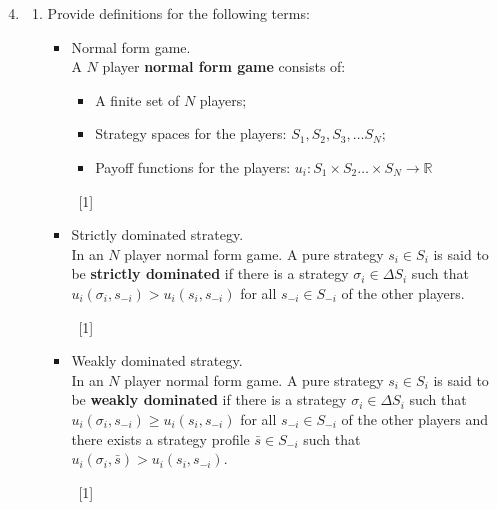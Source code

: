 \documentclass[12pt,a4paper]{article}
\renewcommand{\labelenumi}{\arabic{enumi}} %
\begin{document}
\null \vskip1cm
\begin{enumerate}
\setcounter{enumi}{3}

\renewcommand\labelenumi{\bfseries\theenumi.}

\item

    \begin{enumerate}
        \item Provide definitions for the following terms:
            \begin{itemize}
                \item Normal form game.\\


                A $N$ player \textbf{normal form game} consists of:
                \begin{itemize}
                \item A finite set of $N$ players;
                \item Strategy spaces for the players: $S_1, S_2, S_3, \dots S_N$;
                \item Payoff functions for the players: $u_i:S_{1}\times S_2\dots\times S_N\to \mathbb{R}$
                \end{itemize}

                ~\hfill{[1]}

                \item Strictly dominated strategy.\\

                In an $N$ player normal form game. A pure strategy $s_i\in S_i$ is said to be \textbf{strictly dominated} if there is a strategy $\sigma_i\in \Delta S_i$ such that $u_i(\sigma_i,s_{-i})>u_{i}(s_i,s_{-i})$ for all $s_{-i}\in S_{-i}$ of the other players.

                ~\hfill{[1]}

                \item Weakly dominated strategy.\\

                In an $N$ player normal form game. A pure strategy $s_i\in S_i$ is said to be \textbf{weakly dominated} if there is a strategy $\sigma_i\in \Delta S_i$ such that $u_i(\sigma_i,s_{-i})\geq u_{i}(s_i,s_{-i})$ for all $s_{-i}\in S_{-i}$ of the other players and there exists a strategy profile $\bar s\in S_{-i}$ such that $u_i(\sigma_i,\bar s)> u_{i}(s_i,s_{-i})$.

                ~\hfill{[1]}


\end{itemize}
\end{enumerate}
\end{enumerate}
\end{document}
